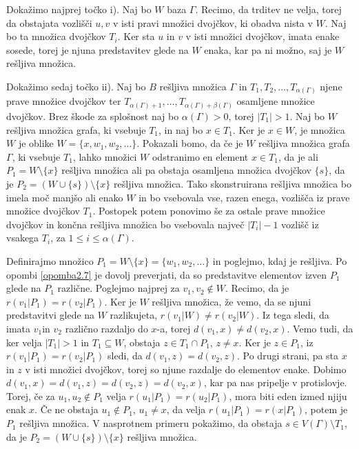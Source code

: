 \documentclass[mat1, tisk]{fmfdelo}
\begin{document}
\begin{dokaz}
  Dokažimo najprej točko i). Naj bo $W$ baza $\Gamma$. Recimo, da trditev ne velja, 
  torej da obstajata vozlišči $u,v$ v isti pravi množici dvojčkov, ki obadva nista v $W$. 
  Naj bo ta množica dvojčkov $T_i$. Ker sta $u$ in $v$ v isti množici dvojčkov, 
  imata enake sosede, torej je njuna predstavitev glede na $W$ enaka, kar pa ni 
  možno, saj je $W$ rešljiva množica.

  Dokažimo sedaj točko ii). Naj bo $B$ rešljiva množica $\Gamma$ in 
  $T_1, T_2, \ldots, T_{\alpha(\Gamma)}$ njene prave množice dvojčkov ter 
  $T_{\alpha(\Gamma)+1}, \ldots, T_{\alpha(\Gamma)+\beta(\Gamma)}$ osamljene množice dvojčkov.
  Brez škode za splošnost naj bo $\alpha(\Gamma) > 0$, torej $|T_1| > 1$. 
  Naj bo $W$ rešljiva množica grafa, ki vsebuje $T_1$, in naj bo $x \in T_1$. 
  Ker je $x \in W$, je množica $W$ je oblike $W = \{x, w_1, w_2, \ldots\}$.
  Pokazali bomo, da če je $W$ rešljiva množica grafa $\Gamma$, ki vsebuje $T_1$, lahko 
  množici $W$ odstranimo en element $x \in T_1$, da je ali $P_1 = W \setminus \{x\}$ 
  rešljiva množica ali pa obstaja osamljena množica dvojčkov $\{s\}$, da je 
  $P_2 = (W \cup \{s\}) \setminus \{x\}$ rešljiva množica. Tako skonstruirana rešljiva 
  množica bo imela moč manjšo ali enako $W$ in bo vsebovala vse, razen enega, vozlišča 
  iz prave množice dvojčkov $T_1$. Postopek potem ponovimo še za ostale prave množice dvojčkov 
  in končna rešljiva množica bo vsebovala največ $|T_i| - 1$ vozlišč 
  iz vsakega $T_i$, za $1 \leq i \leq \alpha(\Gamma)$.

  Definirajmo množico $P_1 = W \setminus \{x\} = \{w_1, w_2, \ldots\}$ in poglejmo, kdaj je 
  rešljiva. Po opombi \ref{opomba2.7} je dovolj preverjati, da so predstavitve elementov 
  izven $P_1$ glede na $P_1$ različne. Poglejmo najprej za $v_1, v_2 \notin W$. Recimo, da je 
  $r(v_1|P_1) = r(v_2|P_1)$. Ker je $W$ rešljiva množica, že vemo, da se njuni predstavitvi 
  glede na $W$ razlikujeta, $r(v_1|W) \neq r(v_2|W)$. Iz tega sledi, da imata $v_1$in $v_2$ 
  različno razdaljo do $x$-a, torej $d(v_1, x) \neq d(v_2, x)$. Vemo tudi, da ker velja 
  $|T_1| > 1$ in $T_1 \subseteq W$, obstaja $z \in T_1 \cap P_1$, $z \neq x$. Ker je $z \in P_1$, 
  iz $r(v_1|P_1) = r(v_2|P_1)$ sledi, da $d(v_1, z) = d(v_2, z)$. Po drugi strani, pa 
  sta $x$ in $z$ v isti množici dvojčkov, torej so njune razdalje do elementov enake. 
  Dobimo $d(v_1, x) = d(v_1, z) = d(v_2, z) = d(v_2, x)$, kar pa nas pripelje v 
  protislovje. Torej, če za $u_1, u_2 \notin P_1$ velja $r(u_1|P_1) = r(u_2|P_1)$, 
  mora biti eden izmed njiju enak $x$. Če ne obstaja $u_1 \notin P_1$, $u_1 \neq x$, da 
  velja $r(u_1|P_1) = r(x|P_1)$, potem je $P_1$ rešljiva množica. V nasprotnem primeru 
  pokažimo, da obstaja $s \in V(\Gamma) \setminus T_1$,
  da je $P_2 = (W \cup \{s\}) \setminus \{x\}$ rešljiva množica.


\end{dokaz}
\end{document}
